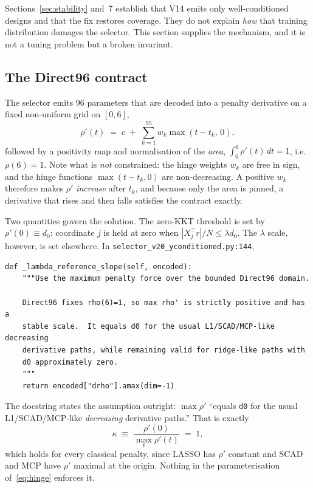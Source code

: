 \documentclass[11pt]{article}
\begin{document}
Sections~\ref{sec:stability} and~7 establish that V14 emits only
well-conditioned designs and that the fix restores coverage. They do not
explain \emph{how} that training distribution damages the selector. This
section supplies the mechanism, and it is not a tuning problem but a broken
invariant.

\subsection{The Direct96 contract}

The selector emits $96$ parameters that are decoded into a penalty derivative
on a fixed non-uniform grid on $[0,6]$,
%
\begin{equation}
\rho'(t) \;=\; c \;+\; \sum_{k=1}^{95} w_k \max(t - t_k,\, 0),
\label{eq:hinge}
\end{equation}
%
followed by a positivity map and normalisation of the \emph{area},
$\int_0^6 \rho'(t)\,dt = 1$, i.e.\ $\rho(6) = 1$. Note what is \emph{not}
constrained: the hinge weights $w_k$ are free in sign, and the hinge functions
$\max(t-t_k,0)$ are non-decreasing. A positive $w_k$ therefore makes $\rho'$
\emph{increase} after $t_k$, and because only the area is pinned, a derivative
that rises and then falls satisfies the contract exactly.

Two quantities govern the solution. The zero-KKT threshold is set by
$\rho'(0) \equiv d_0$: coordinate $j$ is held at zero when
$|X_j^\top r|/N \le \lambda d_0$. The $\lambda$ scale, however, is set
elsewhere. In \texttt{selector\_v20\_yconditioned.py:144},

\begin{verbatim}
def _lambda_reference_slope(self, encoded):
    """Use the maximum penalty force over the bounded Direct96 domain.

    Direct96 fixes rho(6)=1, so max rho' is strictly positive and has a
    stable scale.  It equals d0 for the usual L1/SCAD/MCP-like decreasing
    derivative paths, while remaining valid for ridge-like paths with
    d0 approximately zero.
    """
    return encoded["drho"].amax(dim=-1)
\end{verbatim}

The docstring states the assumption outright: $\max\rho'$ ``equals \texttt{d0}
for the usual L1/SCAD/MCP-like \emph{decreasing} derivative paths.'' That is
exactly
%
\begin{equation}
\kappa \;\equiv\; \frac{\rho'(0)}{\max_t \rho'(t)} \;=\; 1 ,
\label{eq:kappa}
\end{equation}
%
which holds for every classical penalty, since LASSO has $\rho'$ constant and
SCAD and MCP have $\rho'$ maximal at the origin. Nothing in the
parameterisation of~\eqref{eq:hinge} enforces it.
\end{document}
